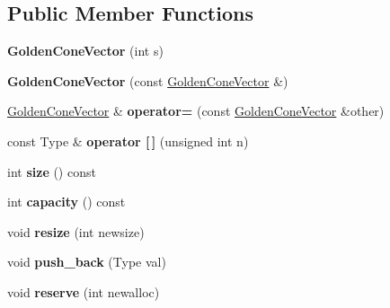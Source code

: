 \subsection*{Public Member Functions}
\begin{DoxyCompactItemize}
\item 
\mbox{\label{class_golden_cone_vector_a71f4b758ace85746a4ad04625191e475}} 
{\bfseries Golden\+Cone\+Vector} (int s)
\item 
\mbox{\label{class_golden_cone_vector_ab130d9977c128b19b05028a524587f13}} 
{\bfseries Golden\+Cone\+Vector} (const \mbox{\hyperlink{class_golden_cone_vector}{Golden\+Cone\+Vector}} \&)
\item 
\mbox{\label{class_golden_cone_vector_adc4c5b8ee0c9b005737c5a01047266cc}} 
\mbox{\hyperlink{class_golden_cone_vector}{Golden\+Cone\+Vector}} \& {\bfseries operator=} (const \mbox{\hyperlink{class_golden_cone_vector}{Golden\+Cone\+Vector}} \&other)
\item 
\mbox{\label{class_golden_cone_vector_ada3090319161478b8c9bb3ca35175774}} 
const Type \& {\bfseries operator \mbox{[}$\,$\mbox{]}} (unsigned int n)
\item 
\mbox{\label{class_golden_cone_vector_aa6aaef86e5c3481c1423d37c41c9db33}} 
int {\bfseries size} () const
\item 
\mbox{\label{class_golden_cone_vector_a127f86a04525d935c183195330a85780}} 
int {\bfseries capacity} () const
\item 
\mbox{\label{class_golden_cone_vector_a89a420c701f5439a9b418daaede53081}} 
void {\bfseries resize} (int newsize)
\item 
\mbox{\label{class_golden_cone_vector_ae86125397203f720c7f7a58822363919}} 
void {\bfseries push\+\_\+back} (Type val)
\item 
\mbox{\label{class_golden_cone_vector_aae3c2e2056f3c7d3abfe27fc2fcdfd78}} 
void {\bfseries reserve} (int newalloc)
\item 

\end{DoxyCompactItemize}
